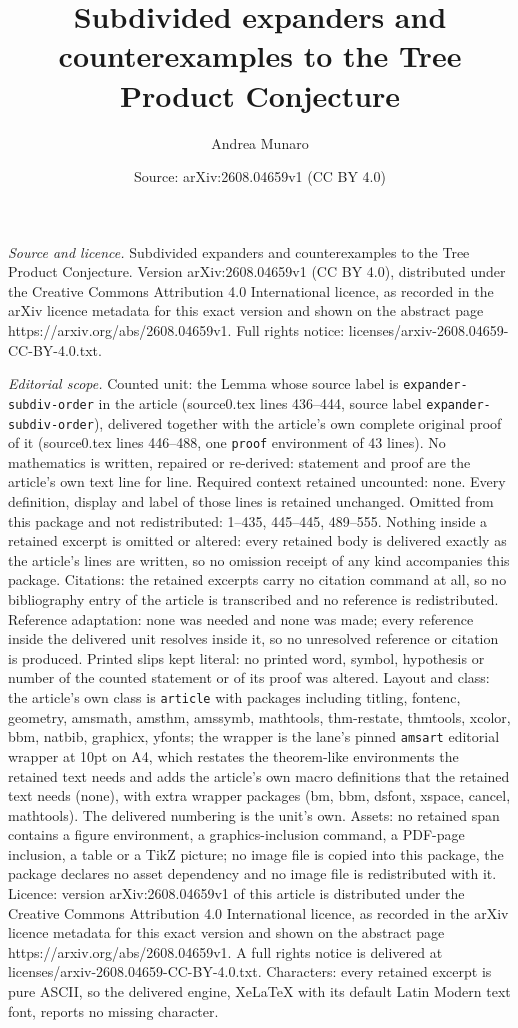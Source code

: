 \documentclass[10pt,a4paper]{amsart}
\title[Subdivided expanders and counterexamples to the Tree Product]{Subdivided expanders and counterexamples to the Tree Product Conjecture}
\author{Andrea Munaro}
\date{Source: arXiv:2608.04659v1 (CC BY 4.0)}
\begin{document}
\maketitle

\noindent\emph{Source and licence.} Subdivided expanders and counterexamples to the Tree Product Conjecture. Version arXiv:2608.04659v1 (CC BY 4.0), distributed under the Creative Commons Attribution 4.0 International licence, as recorded in the arXiv licence metadata for this exact version and shown on the abstract page https://arxiv.org/abs/2608.04659v1. Full rights notice: licenses/arxiv-2608.04659-CC-BY-4.0.txt.\par\smallskip

\noindent\textit{Editorial scope.} Counted unit: the Lemma whose source label is \texttt{expander-subdiv-order} in the article (source0.tex lines 436--444, source label \texttt{expander-subdiv-order}), delivered together with the article's own complete original proof of it (source0.tex lines 446--488, one \texttt{proof} environment of 43 lines). No mathematics is written, repaired or re-derived: statement and proof are the article's own text line for line. Required context retained uncounted: none. Every definition, display and label of those lines is retained unchanged. Omitted from this package and not redistributed: 1--435, 445--445, 489--555. Nothing inside a retained excerpt is omitted or altered: every retained body is delivered exactly as the article's lines are written, so no omission receipt of any kind accompanies this package. Citations: the retained excerpts carry no citation command at all, so no bibliography entry of the article is transcribed and no reference is redistributed. Reference adaptation: none was needed and none was made; every reference inside the delivered unit resolves inside it, so no unresolved reference or citation is produced. Printed slips kept literal: no printed word, symbol, hypothesis or number of the counted statement or of its proof was altered. Layout and class: the article's own class is \texttt{article} with packages including titling, fontenc, geometry, amsmath, amsthm, amssymb, mathtools, thm-restate, thmtools, xcolor, bbm, natbib, graphicx, yfonts; the wrapper is the lane's pinned \texttt{amsart} editorial wrapper at 10pt on A4, which restates the theorem-like environments the retained text needs and adds the article's own macro definitions that the retained text needs (none), with extra wrapper packages (bm, bbm, dsfont, xspace, cancel, mathtools). The delivered numbering is the unit's own. Assets: no retained span contains a figure environment, a graphics-inclusion command, a PDF-page inclusion, a table or a TikZ picture; no image file is copied into this package, the package declares no asset dependency and no image file is redistributed with it. Licence: version arXiv:2608.04659v1 of this article is distributed under the Creative Commons Attribution 4.0 International licence, as recorded in the arXiv licence metadata for this exact version and shown on the abstract page https://arxiv.org/abs/2608.04659v1. A full rights notice is delivered at licenses/arxiv-2608.04659-CC-BY-4.0.txt. Characters: every retained excerpt is pure ASCII, so the delivered engine, XeLaTeX with its default Latin Modern text font, reports no missing character.
\end{document}
